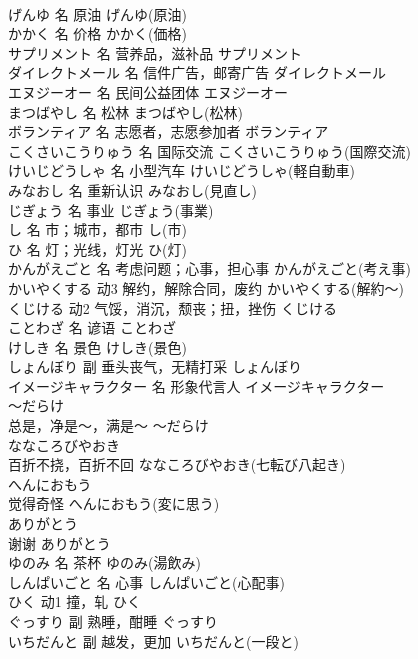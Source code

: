 \documentclass[8pt]{extreport}
\begin{document}
\begin{CJK}{UTF8}{min}
\\	げんゆ	名	原油	げんゆ(原油)	
\\	かかく	名	价格	かかく(価格)	
\\	サプリメント	名	营养品，滋补品	サプリメント	
\\	ダイレクトメール	名	信件广告，邮寄广告	ダイレクトメール	
\\	エヌジーオー	名	民间公益团体	エヌジーオー
\\	まつばやし	名	松林	まつばやし(松林)	
\\	ボランティア	名	志愿者，志愿参加者	ボランティア	
\\	こくさいこうりゅう	名	国际交流	こくさいこうりゅう(国際交流)	
\\	けいじどうしゃ	名	小型汽车	けいじどうしゃ(軽自動車)	
\\	みなおし	名	重新认识	みなおし(見直し)	
\\	じぎょう	名	事业	じぎょう(事業)	
\\	し	名	市；城市，都市	し(市)	
\\	ひ	名	灯；光线，灯光	ひ(灯)	
\\	かんがえごと	名	考虑问题；心事，担心事	かんがえごと(考え事)	
\\	かいやくする	动3	解约，解除合同，废约	かいやくする(解約～)	
\\	くじける	动2	气馁，消沉，颓丧；扭，挫伤	くじける	
\\	ことわざ	名	谚语	ことわざ	
\\	けしき	名	景色	けしき(景色)	
\\	しょんぼり	副	垂头丧气，无精打采	しょんぼり	
\\	イメージキャラクター	名	形象代言人	イメージキャラクター	
\\	～だらけ	
\\	总是，净是～，满是～	～だらけ	
\\	ななころびやおき	
\\	百折不挠，百折不回	ななころびやおき(七転び八起き)	
\\	へんにおもう	
\\	觉得奇怪	へんにおもう(変に思う)	
\\	ありがとう	
\\	谢谢	ありがとう	
\\	ゆのみ	名	茶杯	ゆのみ(湯飲み)	
\\	しんぱいごと	名	心事	しんぱいごと(心配事)	
\\	ひく	动1	撞，轧	ひく	
\\	ぐっすり	副	熟睡，酣睡	ぐっすり	
\\	いちだんと	副	越发，更加	いちだんと(一段と)	

\end{CJK}
\end{document}
